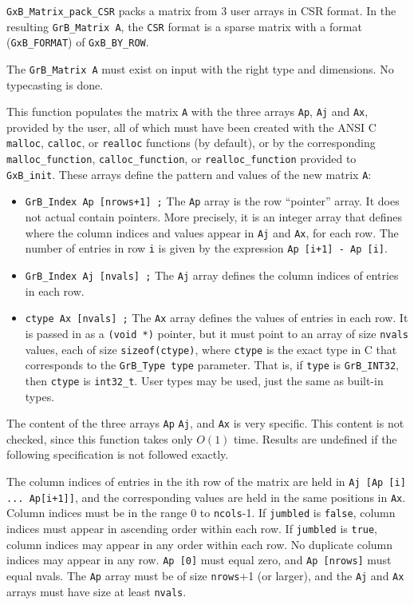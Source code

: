 \documentclass[12pt]{article}
\begin{document}
{\verb'GxB_Matrix_pack_CSR' packs a matrix from 3 user arrays in CSR format.
In the resulting \verb'GrB_Matrix A', the \verb'CSR' format is a sparse matrix
with a format (\verb'GxB_FORMAT') of \verb'GxB_BY_ROW'.

The \verb'GrB_Matrix A' must exist on input with the right type and
dimensions.  No typecasting is done.

This function populates the matrix
\verb'A' with the three arrays \verb'Ap', \verb'Aj' and \verb'Ax', provided by
the user, all of which must have been created with the ANSI C \verb'malloc',
\verb'calloc', or \verb'realloc' functions (by default), or by the
corresponding \verb'malloc_function', \verb'calloc_function', or
\verb'realloc_function' provided to \verb'GxB_init'.  These arrays define the
pattern and values of the new matrix \verb'A':

\begin{itemize}
\item \verb'GrB_Index Ap [nrows+1] ;'  The \verb'Ap' array is the row
``pointer'' array.  It does not actual contain pointers.  More precisely, it is
an integer array that defines where the column indices and values appear in
\verb'Aj' and \verb'Ax', for each row.  The number of entries in row \verb'i'
is given by the expression \verb'Ap [i+1] - Ap [i]'.

\item \verb'GrB_Index Aj [nvals] ;'  The \verb'Aj' array defines the
column indices of entries in each row.

\item \verb'ctype Ax [nvals] ;'  The \verb'Ax' array defines the values of
entries in each row.  It is passed in as a \verb'(void *)' pointer, but it must
point to an array of size \verb'nvals' values, each of size
\verb'sizeof(ctype)', where \verb'ctype' is the exact type in C that corresponds
to the \verb'GrB_Type type' parameter.  That is, if \verb'type' is
\verb'GrB_INT32', then \verb'ctype' is \verb'int32_t'.  User types
may be used, just the same as built-in types.
\end{itemize}

The content of the three arrays \verb'Ap' \verb'Aj', and \verb'Ax' is very
specific.  This content is not checked, since this function takes only
$O(1)$ time.  Results are undefined if the following specification is not
followed exactly.

The column indices of entries in the ith row of the matrix are held in
\verb'Aj [Ap [i] ... Ap[i+1]]', and the corresponding values are held in the
same positions in \verb'Ax'.  Column indices must be in the range 0 to
\verb'ncols'-1.  If \verb'jumbled' is \verb'false', column indices must appear
in ascending order within each row.  If \verb'jumbled' is \verb'true', column
indices may appear in any order within each row.  No duplicate column indices
may appear in any row.  \verb'Ap [0]' must equal zero, and \verb'Ap [nrows]'
must equal nvals.  The \verb'Ap' array must be of size \verb'nrows'+1 (or
larger), and the \verb'Aj' and \verb'Ax' arrays must have size at least
\verb'nvals'.

}
\end{document}
